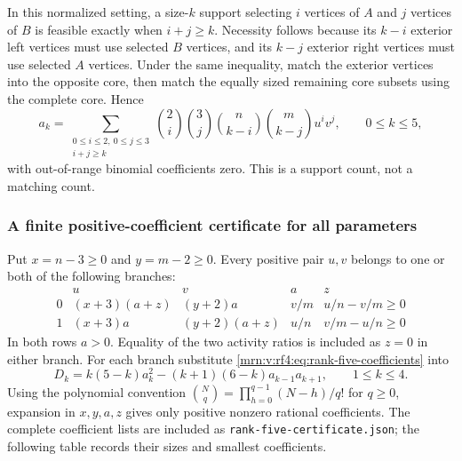 \documentclass[11pt,a4paper]{article}
\theoremstyle{remark}\newtheorem{remark}[theorem]{Remark}
\begin{document}
In this normalized setting, a size-$k$ support selecting $i$ vertices of $A$ and $j$ vertices of $B$ is feasible exactly when $i+j\ge k$. Necessity follows because its $k-i$ exterior left vertices must use selected $B$ vertices, and its $k-j$ exterior right vertices must use selected $A$ vertices. Under the same inequality, match the exterior vertices into the opposite core, then match the equally sized remaining core subsets using the complete core. Hence
\begin{equation}\label{mrn:v:rf4:eq:rank-five-coefficients}
a_k=\sum_{\substack{0\le i\le2,\ 0\le j\le3\\i+j\ge k}}
\binom2i\binom3j\binom n{k-i}\binom m{k-j}u^iv^j,
\qquad0\le k\le5,
\end{equation}
with out-of-range binomial coefficients zero. This is a support count, not a matching count.

\subsubsection{A finite positive-coefficient certificate for all parameters}
Put $x=n-3\ge0$ and $y=m-2\ge0$. Every positive pair $u,v$ belongs to one or both of the following branches:
\[
\begin{array}{c|cc|cc}
&u&v&a&z\\\hline
0&(x+3)(a+z)&(y+2)a&v/m&u/n-v/m\ge0\\
1&(x+3)a&(y+2)(a+z)&u/n&v/m-u/n\ge0
\end{array}
\]
In both rows $a>0$. Equality of the two activity ratios is included as $z=0$ in either branch. For each branch substitute \eqref{mrn:v:rf4:eq:rank-five-coefficients} into
\[
D_k=k(5-k)a_k^2-(k+1)(6-k)a_{k-1}a_{k+1},\qquad1\le k\le4.
\]
Using the polynomial convention $\binom Nq=\prod_{h=0}^{q-1}(N-h)/q!$ for $q\ge0$, expansion in $x,y,a,z$ gives only positive nonzero rational coefficients. The complete coefficient lists are included as \texttt{rank-five-certificate.json}; the following table records their sizes and smallest coefficients.
\end{document}
